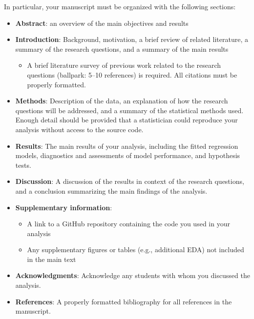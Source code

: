 \documentclass[11pt]{article}
\begin{document}
\noindent In particular, your manuscript must be organized with the following sections:
\begin{itemize}
\item \textbf{Abstract}: an overview of the main objectives and results

\item \textbf{Introduction}: Background, motivation, a brief review of related literature, a summary of the research questions, and a summary of the main results
\begin{itemize}
\item A brief literature survey of previous work related to the research questions (ballpark: 5--10 references) is required. All citations must be properly formatted.
\end{itemize}

\item \textbf{Methods}: Description of the data, an explanation of how the research questions will be addressed, and a summary of the statistical methods used. Enough detail should be provided that a statistician could reproduce your analysis without access to the source code.

\item \textbf{Results}: The main results of your analysis, including the fitted regression models, diagnostics and assessments of model performance, and hypothesis tests.

\item \textbf{Discussion}: A discussion of the results in context of the research questions, and a conclusion summarizing the main findings of the analysis.

\item \textbf{Supplementary information}: 
\begin{itemize}
\item A link to a GitHub repository containing the code you used in your analysis
\item Any supplementary figures or tables (e.g., additional EDA) not included in the main text
\end{itemize}

\item \textbf{Acknowledgments}: Acknowledge any students with whom you discussed the analysis.

\item \textbf{References}: A properly formatted bibliography for all references in the manuscript.
\end{itemize}
\end{document}
